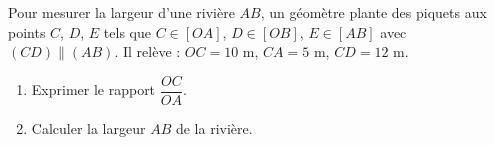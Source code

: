 \documentclass[11pt]{article}
\begin{document}
\begin{exercice}
Pour mesurer la largeur d'une rivière $AB$, un géomètre plante des piquets aux points $C$, $D$, $E$ tels que $C \in [OA]$, $D \in [OB]$, $E \in [AB]$ avec $(CD) \parallel (AB)$.
Il relève : $OC = 10$ m, $CA = 5$ m, $CD = 12$ m.
\begin{enumerate}
    \item Exprimer le rapport $\dfrac{OC}{OA}$.
    \item Calculer la largeur $AB$ de la rivière.
\end{enumerate}
\end{exercice}
\end{document}
